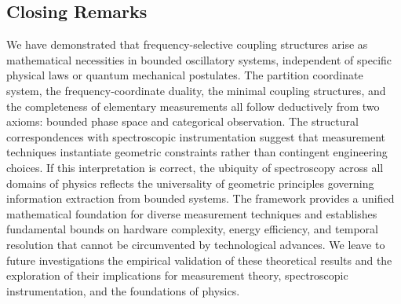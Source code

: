 \documentclass[twocolumn,10pt,a4paper]{article}
\theoremstyle{remark}
\begin{document}
\subsection{Closing Remarks}

We have demonstrated that frequency-selective coupling structures arise as mathematical necessities in bounded oscillatory systems, independent of specific physical laws or quantum mechanical postulates. The partition coordinate system, the frequency-coordinate duality, the minimal coupling structures, and the completeness of elementary measurements all follow deductively from two axioms: bounded phase space and categorical observation. The structural correspondences with spectroscopic instrumentation suggest that measurement techniques instantiate geometric constraints rather than contingent engineering choices. If this interpretation is correct, the ubiquity of spectroscopy across all domains of physics reflects the universality of geometric principles governing information extraction from bounded systems. The framework provides a unified mathematical foundation for diverse measurement techniques and establishes fundamental bounds on hardware complexity, energy efficiency, and temporal resolution that cannot be circumvented by technological advances. We leave to future investigations the empirical validation of these theoretical results and the exploration of their implications for measurement theory, spectroscopic instrumentation, and the foundations of physics.





\end{document}
